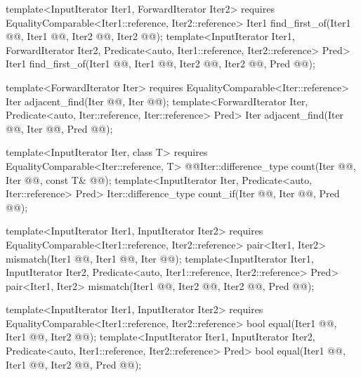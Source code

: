 \documentclass[american,twoside]{book}
\begin{document}
\begin{paras}
\begin{codeblock}
{  template<InputIterator Iter1, ForwardIterator Iter2>
    requires EqualityComparable<Iter1::reference, Iter2::reference>
    Iter1 find_first_of(Iter1 @@, Iter1 @@,
                        Iter2 @@, Iter2 @@);
  template<InputIterator Iter1, ForwardIterator Iter2,
           Predicate<auto, Iter1::reference, Iter2::reference> Pred>
    Iter1 find_first_of(Iter1 @@, Iter1 @@,
                        Iter2 @@, Iter2 @@,
                        Pred @@);

  template<ForwardIterator Iter>
    requires EqualityComparable<Iter::reference>
    Iter adjacent_find(Iter @@, Iter @@);
  template<ForwardIterator Iter, Predicate<auto, Iter::reference, Iter::reference> Pred>
    Iter adjacent_find(Iter @@, Iter @@, Pred @@);

  template<InputIterator Iter, class T>
    requires EqualityComparable<Iter::reference, T>
    @\color{addclr}@Iter::difference_type count(Iter @@, Iter @@, const T& @@);
  template<InputIterator Iter, Predicate<auto, Iter::reference> Pred>
    Iter::difference_type count_if(Iter @@, Iter @@, Pred @@);

  template<InputIterator Iter1, InputIterator Iter2>
    requires EqualityComparable<Iter1::reference, Iter2::reference>
    pair<Iter1, Iter2> mismatch(Iter1 @@, Iter1 @@,
                                Iter @@);
  template<InputIterator Iter1, InputIterator Iter2,
           Predicate<auto, Iter1::reference, Iter2::reference> Pred>
    pair<Iter1, Iter2> mismatch(Iter1 @@, Iter2 @@,
                                Iter2 @@, Pred @@);

  template<InputIterator Iter1, InputIterator Iter2>
    requires EqualityComparable<Iter1::reference, Iter2::reference>
    bool equal(Iter1 @@, Iter1 @@,
               Iter2 @@);
  template<InputIterator Iter1, InputIterator Iter2,
           Predicate<auto, Iter1::reference, Iter2::reference> Pred>
    bool equal(Iter1 @@, Iter1 @@,
               Iter2 @@, Pred @@);

}
\end{codeblock}
\end{paras}
\end{document}
